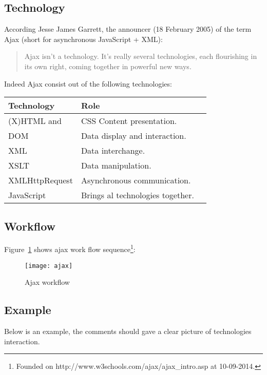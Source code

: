 \subsection{Technology}
According Jesse James Garrett, the announcer (18 February 2005) of the term Ajax (short for asynchronous JavaScript + XML):
\begin{quote}
Ajax isn’t a technology. It’s really several technologies, each flourishing in its own right, coming together in powerful new ways.\cite {jj05}
\end{quote}
Indeed Ajax consist out of the following technologies:
\begin{center}
    \begin{tabular}{l|l p{7cm}}
    \rowcolor{cyan}
    \textbf{Technology} & \textbf{Role} \\ \hline
    \rowcolor{cyan!50}
    (X)HTML and & CSS Content presentation. \\ 
    \rowcolor{cyan!10}
    DOM	& Data display and interaction. \\ 
    \rowcolor{cyan!50}
    XML	& Data interchange. \\ 
    \rowcolor{cyan!10}
    XSLT & Data manipulation. \\ 
    \rowcolor{cyan!50}
    XMLHttpRequest & Asynchronous communication. \\
    \rowcolor{cyan!10}
    JavaScript & Brings al technologies together. \\ 
    \end{tabular}
\end{center}

\subsection{Workflow}
Figure~\ref{fig:ajax} shows ajax work flow sequence\footnote{Founded on http://www.w3schools.com/ajax/ajax\_intro.asp at 10-09-2014.}: 
\begin{center}
	\begin{figure}[h!]
	  \centering
		\texttt{[image: ajax]}
	  \caption{Ajax workflow}
	  \label{fig:ajax}
	\end{figure}
\end{center}

\subsection{Example}
Below is an example, the comments should gave a clear picture of technologies interaction\cite{w3s}.

